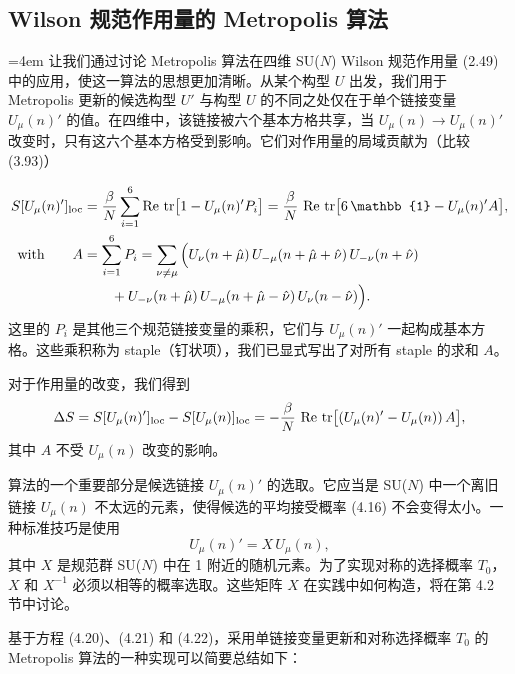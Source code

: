 \subsection{Wilson 规范作用量的 Metropolis 算法}

\begingroup\emergencystretch=4em 让我们通过讨论 Metropolis 算法在四维 SU($N$) Wilson 规范作用量 (2.49) 中的应用，使这一算法的思想更加清晰。从某个构型 $U$ 出发，我们用于\linebreak[0] Metropolis 更新的候选构型 $U'$ 与构型 $U$ 的不同之处仅在于单个链接变量 $U_\mu(n)'$ 的值。在四维中，该链接被六个基本方格共享，当 $U_\mu(n) \to U_\mu(n)'$ 改变时，只有这六个基本方格受到影响。它们对作用量的局域贡献为（比较 (3.93)）\par\endgroup
\begin{equation}
  \begin{split}
    S[U_\mu(n)']_{\mathrm{loc}}
    &= \frac{\beta}{N}\sum_{i=1}^{6}\Re\,\tr\!\big[1 - U_\mu(n)' P_i\big]
     = \frac{\beta}{N}\,\Re\,\tr\!\big[6\,\mathbb{1} - U_\mu(n)' A\big], \\
    \text{with}\qquad
    A &= \sum_{i=1}^{6} P_i
     = \sum_{\nu\neq\mu}\Big(U_\nu(n+\hat{\mu})\,U_{-\mu}(n+\hat{\mu}+\hat{\nu})\,U_{-\nu}(n+\hat{\nu}) \\
    &\qquad + U_{-\nu}(n+\hat{\mu})\,U_{-\mu}(n+\hat{\mu}-\hat{\nu})\,U_\nu(n-\hat{\nu})\Big).
  \end{split}
\end{equation}
这里的 $P_i$ 是其他三个规范链接变量的乘积，它们与 $U_\mu(n)'$ 一起构成基本方格。这些乘积称为 staple（钉状项），我们已显式写出了对所有 staple 的求和 $A$。

对于作用量的改变，我们得到
\begin{equation}
  \Delta S = S[U_\mu(n)']_{\mathrm{loc}} - S[U_\mu(n)]_{\mathrm{loc}} = -\frac{\beta}{N}\,\operatorname{Re}\,\operatorname{tr}\!\big[(U_\mu(n)' - U_\mu(n))\,A\big],
\end{equation}
其中 $A$ 不受 $U_\mu(n)$ 改变的影响。

算法的一个重要部分是候选链接 $U_\mu(n)'$ 的选取。它应当是 SU($N$) 中一个离旧链接 $U_\mu(n)$ 不太远的元素，使得候选的平均接受概率 (4.16) 不会变得太小。一种标准技巧是使用
\begin{equation}
  U_\mu(n)' = X\,U_\mu(n),
\end{equation}
其中 $X$ 是规范群 SU($N$) 中在 1 附近的随机元素。为了实现对称的选择概率 $T_0$，$X$ 和 $X^{-1}$ 必须以相等的概率选取。这些矩阵 $X$ 在实践中如何构造，将在第 4.2 节中讨论。

基于方程 (4.20)、(4.21) 和 (4.22)，采用单链接变量更新和对称选择概率 $T_0$ 的 Metropolis 算法的一种实现可以简要总结如下：

